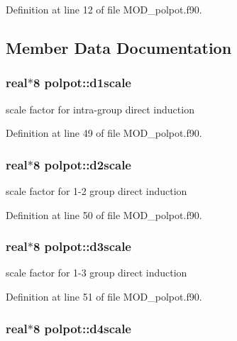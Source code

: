 Definition at line 12 of file M\-O\-D\-\_\-polpot.\-f90.



\subsection{Member Data Documentation}
\hypertarget{classpolpot_a1afa5b69e7d08623c60ec582b49497b9}{
\subsubsection[{d1scale}]{\setlength{\rightskip}{0pt plus 5cm}real$\ast$8 polpot\-::d1scale}}\label{classpolpot_a1afa5b69e7d08623c60ec582b49497b9}


scale factor for intra-\/group direct induction 



Definition at line 49 of file M\-O\-D\-\_\-polpot.\-f90.

\hypertarget{classpolpot_a09dbcc2f2fc3ff7e247b06a89671c00e}{
\subsubsection[{d2scale}]{\setlength{\rightskip}{0pt plus 5cm}real$\ast$8 polpot\-::d2scale}}\label{classpolpot_a09dbcc2f2fc3ff7e247b06a89671c00e}


scale factor for 1-\/2 group direct induction 



Definition at line 50 of file M\-O\-D\-\_\-polpot.\-f90.

\hypertarget{classpolpot_ae8e0a808dea2c739dcff65342f4c22e7}{
\subsubsection[{d3scale}]{\setlength{\rightskip}{0pt plus 5cm}real$\ast$8 polpot\-::d3scale}}\label{classpolpot_ae8e0a808dea2c739dcff65342f4c22e7}


scale factor for 1-\/3 group direct induction 



Definition at line 51 of file M\-O\-D\-\_\-polpot.\-f90.

\hypertarget{classpolpot_aa5806bec776eadd0b1f3c68e7fddc71f}{
\subsubsection[{d4scale}]{\setlength{\rightskip}{0pt plus 5cm}real$\ast$8 polpot\-::d4scale}}\label{classpolpot_aa5806bec776eadd0b1f3c68e7fddc71f}


